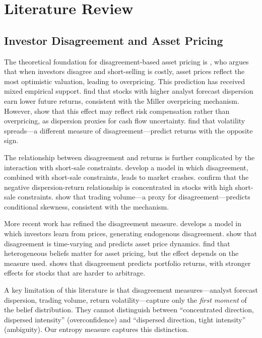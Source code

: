 \documentclass[12pt,a4paper]{article}
\begin{document}
\section{Literature Review}\label{sec:lit}

\subsection{Investor Disagreement and Asset Pricing}

The theoretical foundation for disagreement-based asset pricing is \citet{Miller1977}, who argues that when investors disagree and short-selling is costly, asset prices reflect the most optimistic valuation, leading to overpricing. This prediction has received mixed empirical support. \citet{Diether2002} find that stocks with higher analyst forecast dispersion earn lower future returns, consistent with the Miller overpricing mechanism. However, \citet{Johnson2004} show that this effect may reflect risk compensation rather than overpricing, as dispersion proxies for cash flow uncertainty. \citet{BaliHovakimian2009} find that volatility spreads---a different measure of disagreement---predict returns with the opposite sign.

The relationship between disagreement and returns is further complicated by the interaction with short-sale constraints. \citet{HongStein2003} develop a model in which disagreement, combined with short-sale constraints, leads to market crashes. \citet{Boehme2006} confirm that the negative dispersion-return relationship is concentrated in stocks with high short-sale constraints. \citet{ChenHongStein2001} show that trading volume---a proxy for disagreement---predicts conditional skewness, consistent with the \citet{HongStein2003} mechanism.

More recent work has refined the disagreement measure. \citet{Banerjee2011} develops a model in which investors learn from prices, generating endogenous disagreement. \citet{Carlin2009} show that disagreement is time-varying and predicts asset price dynamics. \citet{Anderson2005} find that heterogeneous beliefs matter for asset pricing, but the effect depends on the measure used. \citet{Yu2011} shows that disagreement predicts portfolio returns, with stronger effects for stocks that are harder to arbitrage.

A key limitation of this literature is that disagreement measures---analyst forecast dispersion, trading volume, return volatility---capture only the \textit{first moment} of the belief distribution. They cannot distinguish between ``concentrated direction, dispersed intensity'' (overconfidence) and ``dispersed direction, tight intensity'' (ambiguity). Our entropy measure captures this distinction.
\end{document}
